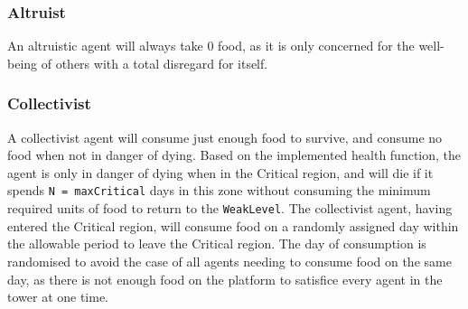 


\subsubsection{Altruist}
An altruistic agent will always take 0 food, as it is only concerned for the well-being of others with a total disregard for itself.

\subsubsection{Collectivist}
A collectivist agent will consume just enough food to survive, and consume no food when not in danger of dying. Based on the implemented health function, the agent is only in danger of dying when in the Critical region, and will die if it spends \texttt{N = maxCritical} days in this zone without consuming the minimum required units of food to return to the \texttt{WeakLevel}. The collectivist agent, having entered the Critical region, will consume food on a randomly assigned day within the allowable period to leave the Critical region. The day of consumption is randomised to avoid the case of all agents needing to consume food on the same day, as there is not enough food on the platform to satisfice every agent in the tower at one time.


